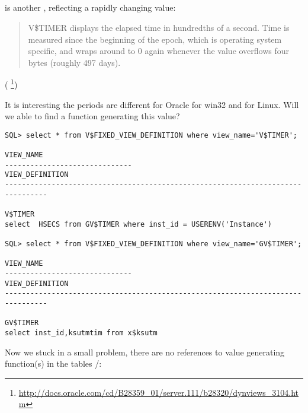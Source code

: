 \subsection{ \oracle}

 
{is another , reflecting a rapidly changing value:}

\begin{framed}
\begin{quotation}
V\$TIMER displays the elapsed time in hundredths of a second. Time is measured since the beginning of the epoch, 
which is operating system specific, and wraps around to 0 again whenever the value overflows four bytes 
(roughly 497 days).
\end{quotation}
\end{framed}(
\footnote{\url{http://docs.oracle.com/cd/B28359_01/server.111/b28320/dynviews_3104.htm}})

{It is interesting the periods are different for Oracle for win32 and for Linux. 
Will we able to find a function generating this value?}


\begin{lstlisting}
SQL> select * from V$FIXED_VIEW_DEFINITION where view_name='V$TIMER';

VIEW_NAME
------------------------------
VIEW_DEFINITION
--------------------------------------------------------------------------------

V$TIMER
select  HSECS from GV$TIMER where inst_id = USERENV('Instance')

SQL> select * from V$FIXED_VIEW_DEFINITION where view_name='GV$TIMER';

VIEW_NAME
------------------------------
VIEW_DEFINITION
--------------------------------------------------------------------------------

GV$TIMER
select inst_id,ksutmtim from x$ksutm
\end{lstlisting}

{Now we stuck in a small problem, there are no references to value generating function(s) 
in the tables /}:

